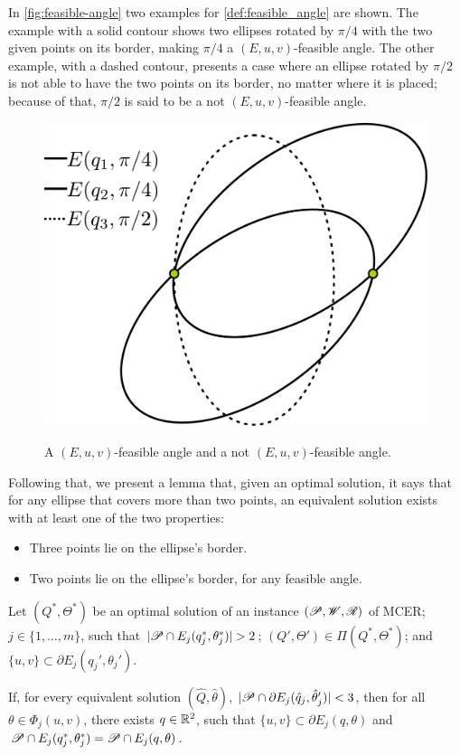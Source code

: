 In \autoref{fig:feasible-angle} two examples for \autoref{def:feasible_angle} are shown. The example with a solid contour shows two ellipses rotated by $\pi/4$ with the two given points on its border, making $\pi/4$ a $(E, u, v)$-feasible angle.
The other example, with a dashed contour, presents a case where an ellipse rotated by $\pi/2$ is not able to have the two points on its border, no matter where it is placed; because of that, $\pi/2$ is said to be a not $(E, u, v)$-feasible angle.

\begin{figure}[H]
	\centering
	\caption{A $(E, u, v)$-feasible angle and a not $(E, u, v)$-feasible angle.}
	\includegraphics[scale=.33]{tex/figures/feasible-angle2}
	\fautor
	\label{fig:feasible-angle}
\end{figure}

Following that, we present a lemma that, given an optimal solution, it says that for any ellipse that covers more than two points, an equivalent solution exists with at least one of the two properties:
\begin{itemize}
	\item Three points lie on the ellipse's border.
	\item Two points lie on the ellipse's border, for any feasible angle.
\end{itemize}

\begin{lema}\label{lema:3pnts}
Let $(Q^*, \Theta^*)$ be an optimal solution of an instance $(\mathscr{P}, \mathscr{W}, \mathscr{R})$ of MCER; $j\in\{1, \dots, m\}$, such that $|\Pp \cap E_j(q_j^*, \theta_j^*)|>2$; $(Q', \Theta')\in\Pi(Q^*, \Theta^*)$; and $\{u, v\}\subset \partial E_j(q_j', \theta_j')$.

If, for every equivalent solution $(\hat{Q}, \hat{\theta})$, $|\mathscr{P}\cap \partial E_j(\hat{q}_j, \hat{\theta}'_j)| < 3$, then for all $\theta\in\Phi_j(u,v)$, there exists $q\in\mathbb{R}^2$, such that $\{u, v\} \subset \partial E_j(q, \theta)$ and $\mathscr{P} \cap E_j(q^*_j, \theta^*_j) = \mathscr{P} \cap E_j(q, \theta)$.

\end{lema}


